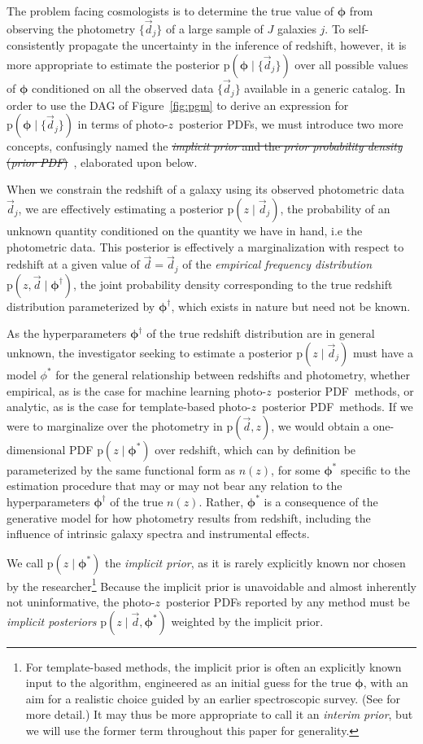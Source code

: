\documentclass[iop]{emulateapj}
\newcommand{\new}[2]{{\color{red}\sout{#1}}\ {\color{blue}{#2}}}%
\newcommand{\Fig}[1]{Figure~\ref{#1}}
\newcommand{\data}{\ensuremath{\vec{d}}}
\newcommand{\pr}[1]{\ensuremath{\mathrm{p}(#1)}}
\newcommand{\gvn}{\mid}
\newcommand{\pz}{photo-$z$}
\newcommand{\pzpdf}{\pz\ posterior PDF}
\newcommand{\nz}{$n(z)$}
\newcommand{\bvec}[1]{\ensuremath{\boldsymbol{#1}}}
\newcommand{\ndphi}{\bvec{\phi}}
\begin{document}
The problem facing cosmologists is to determine the true value of $\ndphi$ from observing the photometry $\{\data_{j}\}$ of a large sample of $J$ galaxies $j$.
To self-consistently propagate the uncertainty in the inference of redshift, however, it is more appropriate to estimate the posterior $\pr{\ndphi \gvn \{\data_{j}\}}$ over all possible values of $\ndphi$ conditioned on all the observed data $\{\data_{j}\}$ available in a generic catalog.
In order to use the DAG of \Fig{fig:pgm} to derive an expression for $\pr{\ndphi \gvn \{\data_{j}\}}$ in terms of \pzpdf s, we must introduce two more concepts, confusingly named the \new{\textit{implicit prior} and the \textit{prior probability density} (\textit{prior PDF})}{implicit prior and the (hyper)prior probability density function}, elaborated upon below.

When we constrain the redshift of a galaxy using its observed photometric data $\data_{j}$, we are effectively estimating a posterior $\pr{z \gvn \data_{j}}$, the probability of an unknown quantity conditioned on the quantity we have in hand, i.e the photometric data.
This posterior is effectively a marginalization with respect to redshift at a given value of $\data = \data_{j}$ of the \textit{empirical frequency distribution} $\pr{z, \data \gvn \ndphi^{\dagger}}$, the joint probability density corresponding to the true redshift distribution parameterized by $\ndphi^{\dagger}$, which exists in nature but need not be known.

As the hyperparameters $\ndphi^{\dagger}$ of the true redshift distribution are in general unknown, the investigator seeking to estimate a posterior $\pr{z \gvn \data_{j}}$ must have a model $\phi^{*}$ for the general relationship between redshifts and photometry, whether empirical, as is the case for machine learning \pzpdf\ methods, or analytic, as is the case for template-based \pzpdf\ methods.
If we were to marginalize over the photometry in $\pr{\data, z}$, we would obtain a one-dimensional PDF $\pr{z \gvn \ndphi^{*}}$ over redshift, which can by definition be parameterized by the same functional form as \nz, for some $\ndphi^{*}$ specific to the estimation procedure that may or may not bear any relation to the hyperparameters $\ndphi^{\dagger}$ of the true \nz.
Rather, $\ndphi^{*}$ is a consequence of the generative model for how photometry results from redshift, including the influence of intrinsic galaxy spectra and instrumental effects. 

We call $\pr{z \gvn \ndphi^{*}}$ the \textit{implicit prior}, as it is rarely explicitly known nor chosen by the researcher\footnote{For template-based methods, the implicit prior is often an explicitly known input to the algorithm, engineered as an initial guess for the true $\ndphi$, with an aim for a realistic choice guided by an earlier spectroscopic survey.  
(See \citet{benitez_bayesian_2000} for more detail.)
It may thus be more appropriate to call it an \textit{interim prior}, but we will use the former term throughout this paper for generality.}
Because the implicit prior is unavoidable and almost inherently not uninformative, the \pzpdf s reported by any method must be \textit{implicit posteriors} ${\pr{z \gvn \data, \ndphi^{*}}}$ weighted by the implicit prior.
\end{document}
